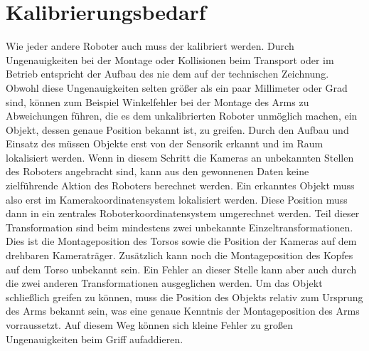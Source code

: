 \section{Kalibrierungsbedarf} %
\label{sec:Kalibrierungsbedarf}
Wie jeder andere Roboter auch muss der \cob kalibriert werden. Durch Ungenauigkeiten bei 
der Montage oder Kollisionen beim Transport oder im Betrieb entspricht der Aufbau des \cob
nie dem auf der technischen Zeichnung. Obwohl diese Ungenauigkeiten selten größer als ein 
paar Millimeter oder Grad sind, können zum Beispiel Winkelfehler bei der Montage des Arms 
zu Abweichungen führen, die es dem unkalibrierten Roboter unmöglich machen, ein Objekt, dessen
genaue Position bekannt ist, zu greifen. Durch den Aufbau und Einsatz des \cob müssen 
Objekte erst von der Sensorik erkannt und im Raum lokalisiert werden. Wenn in diesem Schritt 
die Kameras an unbekannten Stellen des Roboters angebracht sind, kann aus den gewonnenen
Daten keine zielführende Aktion des Roboters berechnet werden. Ein erkanntes Objekt muss also 
erst im Kamerakoordinatensystem lokalisiert werden. Diese Position muss dann in ein zentrales 
Roboterkoordinatensystem umgerechnet werden. Teil dieser Transformation sind beim \cob mindestens
zwei unbekannte Einzeltransformationen. Dies ist die Montageposition des Torsos sowie die 
Position der Kameras auf dem drehbaren Kameraträger. Zusätzlich kann noch die Montageposition
des Kopfes auf dem Torso unbekannt sein. Ein Fehler an dieser Stelle kann aber auch durch die
zwei anderen Transformationen ausgeglichen werden. Um das Objekt schließlich greifen zu können,
muss die Position des Objekts relativ zum Ursprung des Arms bekannt sein, was eine genaue
Kenntnis der Montageposition des Arms vorraussetzt. Auf diesem Weg können sich kleine Fehler
zu großen Ungenauigkeiten beim Griff aufaddieren.

